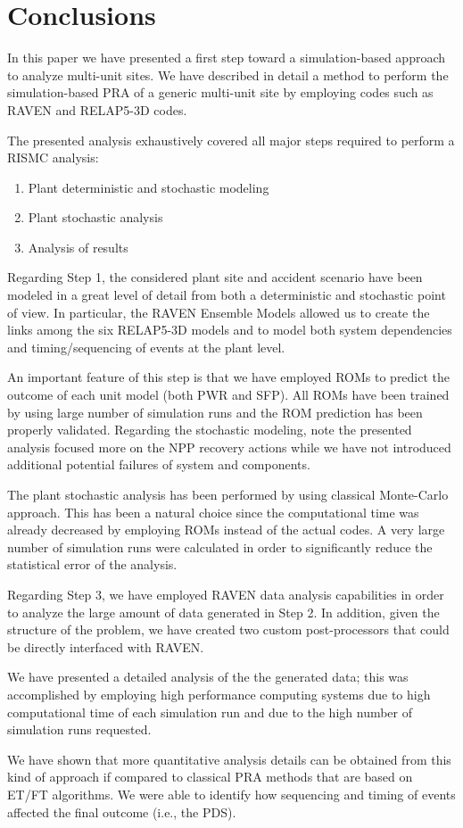 \section{Conclusions}
\label{sec:conclusions}

In this paper we have presented a first step toward a simulation-based approach to analyze 
multi-unit sites. We have described in detail a method to perform the simulation-based PRA
of a generic multi-unit site by employing codes such
as RAVEN and RELAP5-3D codes. 

The presented analysis exhaustively covered all major steps required to perform a RISMC 
analysis:
\begin{enumerate}
  \item Plant deterministic and stochastic modeling
  \item Plant stochastic analysis
  \item Analysis of results
\end{enumerate}

Regarding Step 1, the considered plant site and accident scenario have been modeled in a great level 
of detail from both a deterministic and stochastic point of view. In particular, the
RAVEN Ensemble Models allowed us to create the links among the six RELAP5-3D models and to
model both system dependencies and timing/sequencing of events at the plant level. 

An important feature of this step is that we have employed ROMs to predict the outcome of 
each unit model (both PWR and SFP). All ROMs have been trained by using large number of simulation 
runs and the ROM prediction has been properly validated. Regarding the 
stochastic modeling, note the presented analysis focused more on the NPP recovery actions while we 
have not introduced additional potential failures of system and components.
   
The plant stochastic analysis has been performed by using classical Monte-Carlo approach. 
This has been a natural choice since the computational time was already decreased by employing 
ROMs instead of the actual codes. A very large number of simulation runs were calculated in 
order to significantly reduce the statistical error of the analysis.

Regarding Step 3, we have employed RAVEN data analysis capabilities in order to analyze the 
large amount of data generated in Step 2. In addition, given the structure of the problem, 
we have created two custom post-processors that could be directly interfaced with RAVEN.

We have presented a detailed analysis of the the generated data; this was accomplished  by employing high 
performance computing systems due to high computational time of each simulation run and due 
to the high number of simulation runs requested. 

We have shown that more quantitative analysis details can be obtained from this kind of 
approach if compared to classical PRA methods that are based on ET/FT algorithms. We were able
to identify how sequencing and timing of events affected the final outcome (i.e., the PDS).

